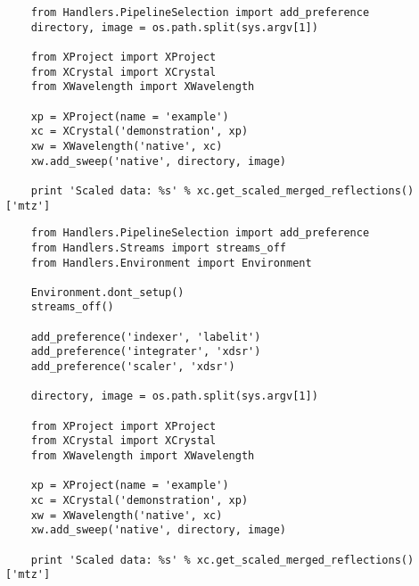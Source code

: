 \documentclass[slides,compress]{beamer}
\begin{document}

\begin{frame}[fragile]
\tiny{
\begin{verbatim}
    from Handlers.PipelineSelection import add_preference
    directory, image = os.path.split(sys.argv[1])

    from XProject import XProject
    from XCrystal import XCrystal
    from XWavelength import XWavelength
   
    xp = XProject(name = 'example')
    xc = XCrystal('demonstration', xp)
    xw = XWavelength('native', xc)
    xw.add_sweep('native', directory, image)
   
    print 'Scaled data: %s' % xc.get_scaled_merged_reflections()['mtz']
\end{verbatim}
}
\end{frame}


\begin{frame}[fragile]
\tiny{
\begin{verbatim}
    from Handlers.PipelineSelection import add_preference
    from Handlers.Streams import streams_off
    from Handlers.Environment import Environment

    Environment.dont_setup()
    streams_off()

    add_preference('indexer', 'labelit')
    add_preference('integrater', 'xdsr')
    add_preference('scaler', 'xdsr')

    directory, image = os.path.split(sys.argv[1])

    from XProject import XProject
    from XCrystal import XCrystal
    from XWavelength import XWavelength
   
    xp = XProject(name = 'example')
    xc = XCrystal('demonstration', xp)
    xw = XWavelength('native', xc)
    xw.add_sweep('native', directory, image)
   
    print 'Scaled data: %s' % xc.get_scaled_merged_reflections()['mtz']
\end{verbatim}
}
\end{frame}
\end{document}
